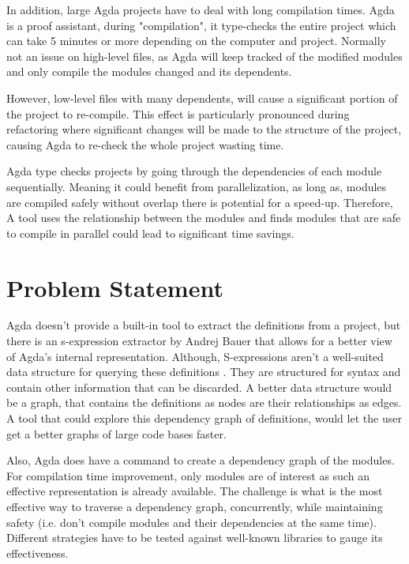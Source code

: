 In addition, large Agda projects have to deal with long compilation times. Agda
is a proof assistant, during "compilation", it type-checks the entire project
which can take 5 minutes or more depending on the computer and project.
Normally not an issue on high-level files, as Agda will keep tracked of the
modified modules and only compile the modules changed and its dependents.

However, low-level files with many dependents, will cause a significant portion
of the project to re-compile. This effect is particularly pronounced during
refactoring where significant changes will be made to the structure of the
project, causing Agda to re-check the whole project wasting time. 

Agda type checks projects by going through the dependencies of each module
sequentially. Meaning it could benefit from parallelization, as long as,
modules are compiled safely without overlap there is potential for a speed-up.
Therefore, A tool uses the relationship between the modules and finds modules
that are safe to compile in parallel could lead to significant time savings.

\section{Problem Statement}

Agda doesn't provide a built-in tool to extract the definitions from a project,
but there is an s-expression extractor by Andrej Bauer \cite{andrej} that
allows for a better view of Agda's internal representation. Although,
S-expressions aren't a well-suited data structure for querying these
definitions .
They are structured for syntax and contain other information that can be
discarded. A better data structure would be a graph, that contains the
definitions as nodes are their relationships as edges. A tool that could
explore this dependency graph of definitions, would let the user get a better
graphs of large code bases faster.

Also, Agda does have a command to create a dependency graph of the modules. For
compilation time improvement, only modules are of interest as such an effective
representation is already available. The challenge is what is the most
effective way to traverse a dependency graph, concurrently, while maintaining
safety (i.e. don't compile modules and their dependencies at the same time).
Different strategies have to be tested against well-known libraries to gauge
its effectiveness. 

